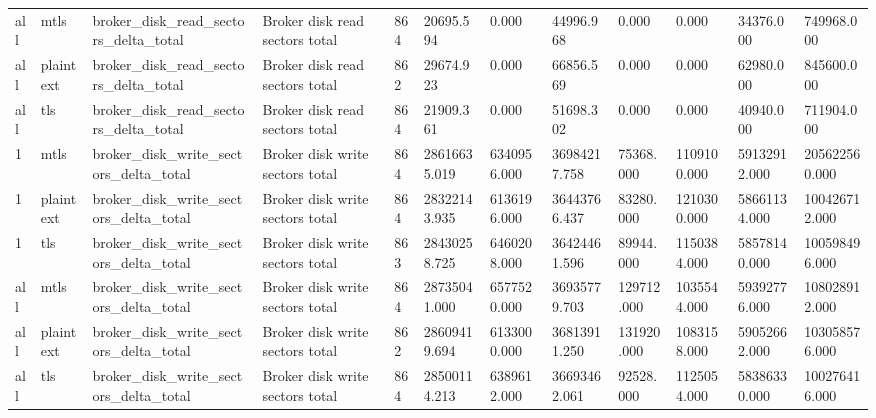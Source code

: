 \begin{longtable}{llllllllllll}
all & mtls & broker\_disk\_read\_sectors\_delta\_total & Broker disk read sectors total & 864 & 20695.594 & 0.000 & 44996.968 & 0.000 & 0.000 & 34376.000 & 749968.000 \\
all & plaintext & broker\_disk\_read\_sectors\_delta\_total & Broker disk read sectors total & 862 & 29674.923 & 0.000 & 66856.569 & 0.000 & 0.000 & 62980.000 & 845600.000 \\
all & tls & broker\_disk\_read\_sectors\_delta\_total & Broker disk read sectors total & 864 & 21909.361 & 0.000 & 51698.302 & 0.000 & 0.000 & 40940.000 & 711904.000 \\
1 & mtls & broker\_disk\_write\_sectors\_delta\_total & Broker disk write sectors total & 864 & 28616635.019 & 6340956.000 & 36984217.758 & 75368.000 & 1109100.000 & 59132912.000 & 205622560.000 \\
1 & plaintext & broker\_disk\_write\_sectors\_delta\_total & Broker disk write sectors total & 864 & 28322143.935 & 6136196.000 & 36443766.437 & 83280.000 & 1210300.000 & 58661134.000 & 100426712.000 \\
1 & tls & broker\_disk\_write\_sectors\_delta\_total & Broker disk write sectors total & 863 & 28430258.725 & 6460208.000 & 36424461.596 & 89944.000 & 1150384.000 & 58578140.000 & 100598496.000 \\
all & mtls & broker\_disk\_write\_sectors\_delta\_total & Broker disk write sectors total & 864 & 28735041.000 & 6577520.000 & 36935779.703 & 129712.000 & 1035544.000 & 59392776.000 & 108028912.000 \\
all & plaintext & broker\_disk\_write\_sectors\_delta\_total & Broker disk write sectors total & 862 & 28609419.694 & 6133000.000 & 36813911.250 & 131920.000 & 1083158.000 & 59052662.000 & 103058576.000 \\
all & tls & broker\_disk\_write\_sectors\_delta\_total & Broker disk write sectors total & 864 & 28500114.213 & 6389612.000 & 36693462.061 & 92528.000 & 1125054.000 & 58386330.000 & 100276416.000 \\
\hline
\end{longtable}
